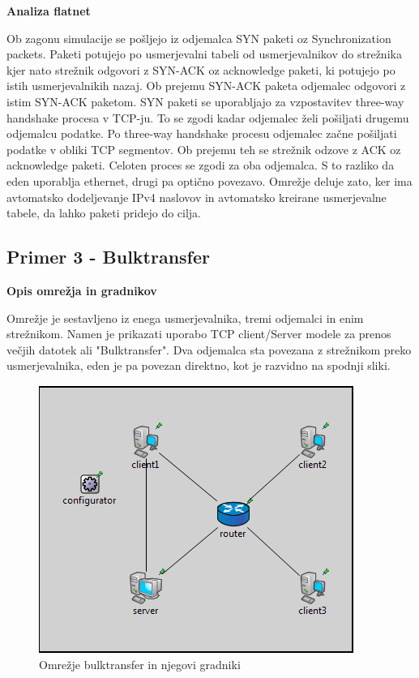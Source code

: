 \documentclass[a4paper,11pt]{article}
\begin{document}
\setlength{\parindent}{0pt}
\large\bf Analiza flatnet\par
\setlength{\parindent}{10pt}
\normalfont \normalsize 
Ob zagonu simulacije se pošljejo iz odjemalca SYN paketi oz Synchronization packets. Paketi potujejo po usmerjevalni tabeli od usmerjevalnikov do strežnika kjer nato strežnik odgovori z SYN-ACK oz acknowledge paketi, ki potujejo po istih usmerjevalnikih nazaj. Ob prejemu SYN-ACK paketa odjemalec odgovori z istim SYN-ACK paketom. SYN paketi se uporabljajo za vzpostavitev three-way handshake procesa v TCP-ju. To se zgodi kadar odjemalec želi pošiljati drugemu odjemalcu podatke. Po three-way handshake procesu odjemalec začne pošiljati podatke v obliki TCP segmentov. Ob prejemu teh se strežnik odzove z ACK oz acknowledge paketi. Celoten proces se zgodi za oba odjemalca. S to razliko da eden uporablja ethernet, drugi pa optično povezavo. Omrežje deluje zato, ker ima avtomatsko dodeljevanje IPv4 naslovov in avtomatsko kreirane usmerjevalne tabele, da lahko paketi pridejo do cilja.

\pagebreak
\subsection{Primer 3 - Bulktransfer}\par
\large \bf Opis omrežja in gradnikov\par
\normalfont \normalsize 
Omrežje je sestavljeno iz enega usmerjevalnika, tremi odjemalci in enim strežnikom. Namen je prikazati uporabo TCP client/Server modele za prenos večjih datotek ali "Bulktransfer". Dva odjemalca sta povezana z strežnikom preko usmerjevalnika, eden je pa povezan direktno, kot je razvidno na spodnji sliki.
\begin{figure}[h]
	\centering
	\includegraphics[width=\textwidth]{BulkTransfer.png}
	\caption{Omrežje bulktransfer in njegovi gradniki}
	\label{bulkTransfer}	
\end{figure}
\end{document}

